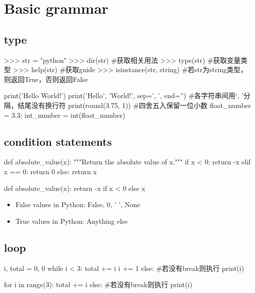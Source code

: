 \section{Basic grammar}

  \subsection{type}
    \begin{codeblock}[language=python, caption={variable type}]
      >>> str = "python"
      >>> dir(str) #获取相关用法
      >>> type(str) #获取变量类型
      >>> help(str) #获取guide
      >>> isinstance(str, string) #若str为string类型，则返回True，否则返回False
    \end{codeblock}

    \begin{codeblock}[language=python, caption={basic functions}]
      print('Hello World!')
      print('Hello', 'World!', sep=', ', end='') #各字符串间用`, '分隔，结尾没有换行符
      print(round(3.75, 1)) #四舍五入保留一位小数
      float_number = 3.3; int_number = int(float_number)
    \end{codeblock}

  \subsection{condition statements}
    \begin{codeblock}[language=python, caption={condition statement}]
      def absolute_value(x):
        """Return the absolute value of x."""
        if x < 0:
          return -x
        elif x == 0:
          return 0
        else:
          return x

      def absolute_value(x):
        return -x if x < 0 else x
    \end{codeblock}

    \begin{itemize}
      \item False values in Python: False, 0, ' ', None
      \item True values in Python: Anything else
    \end{itemize}

  \subsection{loop}
    \begin{codeblock}[language=python, caption={iteration}]
      i, total = 0, 0
      while i < 3:
          total += i
          i += 1
      else: #若没有break则执行
          print(i)

      for i in range(3):
          total += i
      else: #若没有break则执行
          print(i)
    \end{codeblock}

